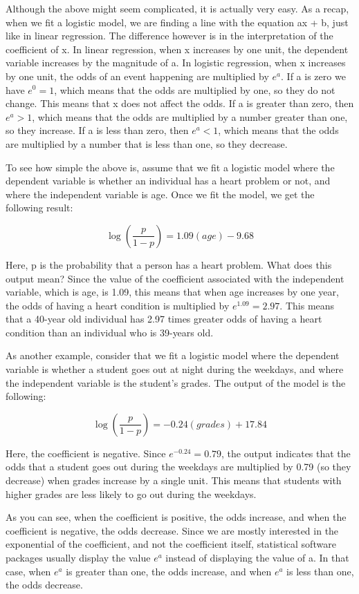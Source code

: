 \documentclass[a4paper,12pt,oneside]{book}
\begin{document}
Although the above might seem complicated, it is actually very easy. As a recap, when we fit a logistic model, we are finding a line with the equation ax + b, just like in linear regression. 
The difference however is in the interpretation of the coefficient of x. In linear regression, when x increases by one unit, the dependent variable increases by the magnitude of a. In logistic 
regression, when x increases by one unit, the odds of an event happening are multiplied by $e^a$. If a is zero we have $e^0=1$, which means that the odds are multiplied by one, so they do not change. 
This means that x does not affect the odds. If a is greater than zero, then $e^a>1$, which means that the odds are multiplied by a number greater than one, so they increase. If a is less than zero, then 
$e^a<1$, which means that the odds are multiplied by a number that is less than one, so they decrease.

To see how simple the above is, assume that we fit a logistic model where the dependent variable is whether an individual has a heart problem or not, and where the independent variable is age. 
Once we fit the model, we get the following result:

$$ \log(\frac{p}{1-p})=1.09(age)-9.68 $$

Here, p is the probability that a person has a heart problem. What does this output mean? Since the value of the coefficient associated with the independent variable, which is age, is 1.09, 
this means that when age increases by one year, the odds of having a heart condition is multiplied by $e^{1.09}=2.97$. This means that a 40-year old individual has 2.97 times greater odds of having a heart condition 
than an individual who is 39-years old. 

As another example, consider that we fit a logistic model where the dependent variable is whether a student goes out at night during the weekdays, and where the independent variable is the student’s grades. 
The output of the model is the following:

$$ \log(\frac{p}{1-p})=-0.24(grades)+17.84 $$ 

Here, the coefficient is negative. Since $e^{-0.24}=0.79$, the output indicates that the odds that a student goes out during the weekdays are multiplied by 0.79 (so they decrease) when grades increase by a single unit. 
This means that students with higher grades are less likely to go out during the weekdays. 

As you can see, when the coefficient is positive, the odds increase, and when the coefficient is negative, the odds decrease. Since we are mostly interested in the exponential of the coefficient, and not the coefficient 
itself, statistical software packages usually display the value $e^a$ instead of displaying the value of a. In that case, when $e^a$ is greater than one, the odds increase, and when $e^a$ is less than one, the odds decrease.
\end{document}
